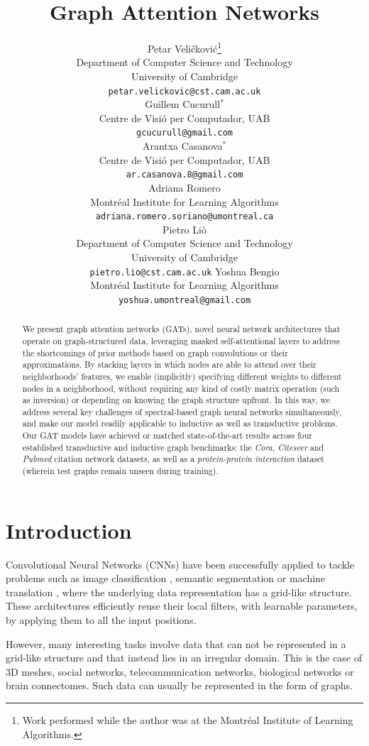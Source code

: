 \documentclass{article} %
\title{Graph Attention Networks}
\author{Petar Veli\v{c}kovi\'{c}\thanks{Work performed while the author was at the Montr\'{e}al Institute of Learning Algorithms.} \\
Department of Computer Science and Technology\\
University of Cambridge\\
\texttt{petar.velickovic@cst.cam.ac.uk} \\
\And
Guillem Cucurull$^*$\\
Centre de Visi\'{o} per Computador, UAB \\
\texttt{gcucurull@gmail.com} \\
\And
Arantxa Casanova$^*$\\
Centre de Visi\'{o} per Computador, UAB \\
\texttt{ar.casanova.8@gmail.com} \\
\And
Adriana Romero \\
Montr\'{e}al Institute for Learning Algorithms \\
\texttt{adriana.romero.soriano@umontreal.ca} \\
\And
Pietro Li\`{o} \\
Department of Computer Science and Technology \\
University of Cambridge\\
\texttt{pietro.lio@cst.cam.ac.uk}
\And 
Yoshua Bengio\\
Montr\'{e}al Institute for Learning Algorithms\\
\texttt{yoshua.umontreal@gmail.com}
}
\begin{document}
\maketitle

\begin{abstract}
We present graph attention networks (GATs), novel neural network architectures that operate on graph-structured data, leveraging masked self-attentional layers to address the shortcomings of prior methods based on graph convolutions or their approximations. By stacking layers in which nodes are able to attend over their neighborhoods' features, we enable (implicitly) specifying different weights to different nodes in a neighborhood, without requiring any kind of costly matrix operation (such as inversion) or depending on knowing the graph structure upfront. In this way, we address several key challenges of spectral-based graph neural networks simultaneously, and make our model readily applicable to inductive as well as transductive problems. Our GAT models have achieved or matched state-of-the-art results across four established transductive and inductive graph benchmarks: the \emph{Cora}, \emph{Citeseer}  and \emph{Pubmed} citation network datasets, as well as a \emph{protein-protein interaction} dataset (wherein test graphs remain unseen during training).
\end{abstract}

\section{Introduction}
\label{sec:intro}

Convolutional Neural Networks (CNNs) have been successfully applied to tackle problems such as image classification \citep{he2016deep}, semantic segmentation \citep{Jegou17} or machine translation \citep{GehringAGD16}, where the underlying data representation has a grid-like structure. These architectures efficiently reuse their local filters, with learnable parameters, by applying them to all the input positions.

However, many interesting tasks involve data that can not be represented in a grid-like structure and that instead lies in an irregular domain. This is the case of 3D meshes, social networks, telecommunication networks, biological networks or brain connectomes. Such data can usually be represented in the form of graphs. 
\end{document}
